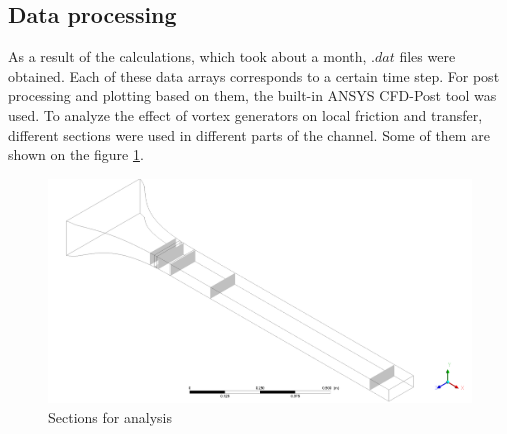 \subsection{Data processing}
	As a result of the calculations, which took about a month, $.dat$ files were obtained. Each of these data arrays corresponds to a certain time step. For post processing and plotting based on them, the built-in ANSYS CFD-Post tool was used. To analyze the effect of vortex generators on local friction and transfer, different sections were used in different parts of the channel. Some of them are shown on the figure \ref{fig:planesforanalysis}. 
	\begin{figure}[H]
		\centering
		\includegraphics[width=0.9\linewidth]{../Assets/1}
		\caption{Sections for analysis}
		\label{fig:planesforanalysis}
	\end{figure}
	
